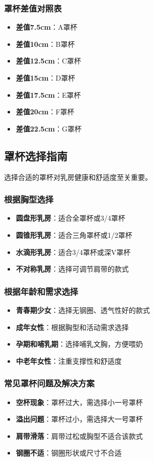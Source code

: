 \documentclass[12pt,UTF8]{ctexbook}
\begin{document}
\subsubsection{罩杯差值对照表}
\begin{itemize}[leftmargin=2cm]
	\item \textbf{差值7.5cm}：A罩杯
	\item \textbf{差值10cm}：B罩杯
	\item \textbf{差值12.5cm}：C罩杯
	\item \textbf{差值15cm}：D罩杯
	\item \textbf{差值17.5cm}：E罩杯
	\item \textbf{差值20cm}：F罩杯
	\item \textbf{差值22.5cm}：G罩杯
\end{itemize}

\subsection{罩杯选择指南}
选择合适的罩杯对乳房健康和舒适度至关重要。

\subsubsection{根据胸型选择}
\begin{itemize}[leftmargin=2cm]
	\item \textbf{圆盘形乳房}：适合全罩杯或3/4罩杯
	\item \textbf{圆锥形乳房}：适合三角罩杯或1/2罩杯
	\item \textbf{水滴形乳房}：适合3/4罩杯或深V罩杯
	\item \textbf{不对称乳房}：选择可调节肩带的款式
\end{itemize}

\subsubsection{根据年龄和需求选择}
\begin{itemize}[leftmargin=2cm]
	\item \textbf{青春期少女}：选择无钢圈、透气性好的款式
	\item \textbf{成年女性}：根据胸型和活动需求选择
	\item \textbf{孕期和哺乳期}：选择哺乳文胸，方便喂奶
	\item \textbf{中老年女性}：注重支撑性和舒适度
\end{itemize}

\subsubsection{常见罩杯问题及解决方案}
\begin{itemize}[leftmargin=2cm]
	\item \textbf{空杯现象}：罩杯过大，需选择小一号罩杯
	\item \textbf{溢出问题}：罩杯过小，需选择大一号罩杯
	\item \textbf{肩带滑落}：肩带过松或胸型不适合该款式
	\item \textbf{钢圈不适}：钢圈形状或尺寸不合适
\end{itemize}
\end{document}
